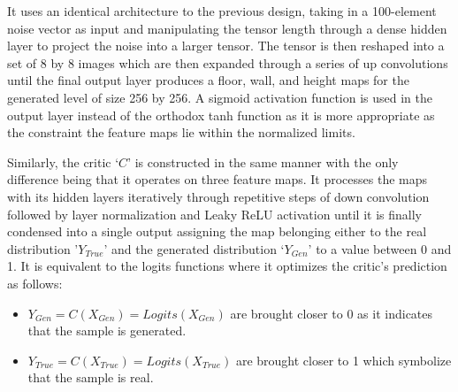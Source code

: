 \documentclass{Configuration_Files/PoliMi3i_thesis}
\begin{document}
It uses an identical architecture to the previous design, taking in a 100-element noise 
vector as input and manipulating the tensor length through a dense hidden 
layer to project the noise into a larger tensor. The tensor is then reshaped into a set of 
8 by 8 images which are then expanded through a series of up convolutions until the 
final output layer produces a floor, wall, and height maps for the generated level of 
size 256 by 256. A sigmoid activation function is used in the output layer instead of 
the orthodox tanh function as it is more appropriate as the constraint the feature 
maps lie within the normalized limits. 

Similarly, the critic ‘$C$’ is constructed in the same manner with the only difference 
being that it operates on three feature maps. It processes the maps with its hidden 
layers iteratively through repetitive steps of down convolution followed by layer 
normalization and Leaky ReLU activation until it is finally condensed into a single 
output assigning the map belonging either to the real distribution ’$Y_{True}$’ and the generated 
distribution ‘$Y_{Gen}$’ to a value between 0 and 1. It is equivalent to the logits functions 
where it optimizes the critic’s prediction as follows:
\begin{itemize}
\item $Y_{Gen} = C(X_{Gen}) = Logits(X_{Gen})$ are brought closer to 0 as it indicates that the
sample is generated.
\item $Y_{True} = C(X_{True}) = Logits(X_{True})$ are brought closer to 1 which symbolize that the 
sample is real. 
\end{itemize}
\end{document}
